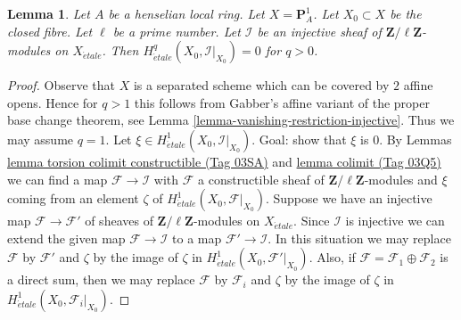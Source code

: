 \documentclass{amsart}
\theoremstyle{plain}
\newtheorem{lemma}[subsection]{Lemma}
\theoremstyle{definition}
\theoremstyle{remark}
\numberwithin{equation}{subsection}
\def\etale{{\acute{e}tale}}
\begin{document}
\begin{lemma}
\label{lemma-efface-cohomology-on-fibre-by-finite-cover}
Let $A$ be a henselian local ring. Let $X = \mathbf{P}^1_A$.
Let $X_0 \subset X$ be the closed fibre. Let $\ell$ be a prime
number. Let $\mathcal{I}$ be an injective sheaf of
$\mathbf{Z}/\ell\mathbf{Z}$-modules on $X_\etale$. Then
$H^q_\etale(X_0, \mathcal{I}|_{X_0}) = 0$ for $q > 0$.
\end{lemma}

\begin{proof}
Observe that $X$ is a separated scheme which can be covered by $2$
affine opens. Hence for $q > 1$ this follows from Gabber's affine
variant of the proper base change theorem, see
Lemma \ref{lemma-vanishing-restriction-injective}.
Thus we may assume $q = 1$. Let
$\xi \in H^1_\etale(X_0, \mathcal{I}|_{X_0})$.
Goal: show that $\xi$ is $0$.
By Lemmas \href{https://stacks.math.columbia.edu/tag/03SA}{lemma torsion colimit constructible (Tag 03SA)} and
\href{https://stacks.math.columbia.edu/tag/03Q5}{lemma colimit (Tag 03Q5)} we can find a map $\mathcal{F} \to \mathcal{I}$
with $\mathcal{F}$ a constructible sheaf of
$\mathbf{Z}/\ell\mathbf{Z}$-modules
and $\xi$ coming from an element $\zeta$ of
$H^1_\etale(X_0, \mathcal{F}|_{X_0})$. Suppose we have an injective map
$\mathcal{F} \to \mathcal{F}'$ of sheaves of
$\mathbf{Z}/\ell\mathbf{Z}$-modules on $X_\etale$.
Since $\mathcal{I}$ is injective we can extend the given map
$\mathcal{F} \to \mathcal{I}$ to a map $\mathcal{F}' \to \mathcal{I}$.
In this situation we may replace $\mathcal{F}$ by $\mathcal{F}'$
and $\zeta$ by the image of $\zeta$ in $H^1_\etale(X_0, \mathcal{F}'|_{X_0})$.
Also, if $\mathcal{F} = \mathcal{F}_1 \oplus \mathcal{F}_2$ is a direct sum,
then we may replace $\mathcal{F}$ by $\mathcal{F}_i$
and $\zeta$ by the image of $\zeta$ in $H^1_\etale(X_0, \mathcal{F}_i|_{X_0})$.


\end{proof}
\end{document}
